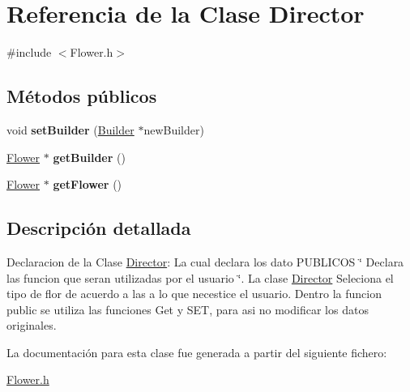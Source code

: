 \hypertarget{class_director}{}\section{Referencia de la Clase Director}
\label{class_director}


{\ttfamily \#include $<$Flower.\+h$>$}

\subsection*{Métodos públicos}
\begin{DoxyCompactItemize}
\item 
\mbox{\label{class_director_aa266ee3382d3bb30df71951ba0976ae4}} 
void {\bfseries set\+Builder} (\mbox{\hyperlink{class_builder}{Builder}} $\ast$new\+Builder)
\item 
\mbox{\label{class_director_ae82a354f701f53efd4fc164147d4d8e7}} 
\mbox{\hyperlink{class_flower}{Flower}} $\ast$ {\bfseries get\+Builder} ()
\item 
\mbox{\label{class_director_a0db8afee3630637eee63370a9de4dc3a}} 
\mbox{\hyperlink{class_flower}{Flower}} $\ast$ {\bfseries get\+Flower} ()
\end{DoxyCompactItemize}


\subsection{Descripción detallada}
Declaracion de la Clase \mbox{\hyperlink{class_director}{Director}}\+: La cual declara los dato P\+U\+B\+L\+I\+C\+OS \char`\"{} Declara las funcion que seran utilizadas por el usuario \char`\"{}. La clase \mbox{\hyperlink{class_director}{Director}} Seleciona el tipo de flor de acuerdo a las a lo que necestice el usuario. Dentro la funcion public se utiliza las funciones Get y S\+ET, para asi no modificar los datos originales. 

La documentación para esta clase fue generada a partir del siguiente fichero\+:\begin{DoxyCompactItemize}
\item 
\mbox{\hyperlink{_flower_8h}{Flower.\+h}}\end{DoxyCompactItemize}
